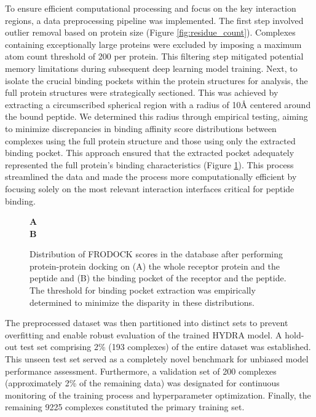 To ensure efficient computational processing and focus on the key interaction regions, a data preprocessing pipeline was implemented. The first step involved outlier removal based on protein size (Figure \ref{fig:residue_count}). Complexes containing exceptionally large proteins were excluded by imposing a maximum atom count threshold of 200 per protein. This filtering step mitigated potential memory limitations during subsequent deep learning model training. Next, to isolate the crucial binding pockets within the protein structures for analysis, the full protein structures were strategically sectioned. This was achieved by extracting a circumscribed spherical region with a radius of 10Å centered around the bound peptide. 
We determined this radius through empirical testing, aiming to minimize discrepancies in binding affinity score distributions between complexes using the full protein structure and those using only the extracted binding pocket. This approach ensured that the extracted pocket adequately represented the full protein's binding characteristics (Figure \ref{fig:pocket_protein_min}). This process streamlined the data and made the process more computationally efficient by focusing solely on the most relevant interaction interfaces critical for peptide binding. \\

\begin{figure}
  \center

  \textbf{\Large A}
   \\

  \textbf{\Large B}

  \caption{Distribution of FRODOCK scores in the database after performing protein-protein docking on (A) the whole receptor protein and the peptide and (B) the binding pocket of the receptor and the peptide. The threshold for binding pocket extraction was empirically determined to minimize the disparity in these distributions.}

  \label{fig:pocket_protein_min}
\end{figure}

The preprocessed dataset was then partitioned into distinct sets to prevent overfitting and enable robust evaluation of the trained HYDRA model. A hold-out test set comprising 2\% (193 complexes) of the entire dataset was established. This unseen test set served as a completely novel benchmark for unbiased model performance assessment. Furthermore, a validation set of 200 complexes (approximately 2\% of the remaining data) was designated for continuous monitoring of the training process and hyperparameter optimization. Finally, the remaining 9225 complexes constituted the primary training set. \\

